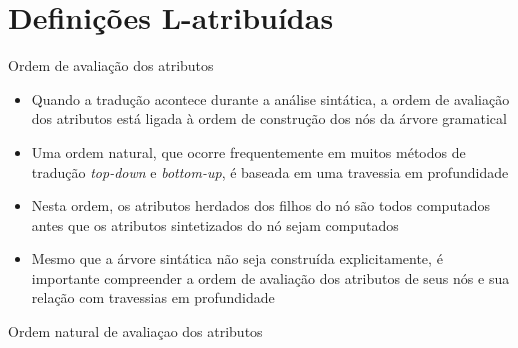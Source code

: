 \section{Definições L-atribuídas}

\begin{frame}[fragile]{Ordem de avaliação dos atributos}

    \begin{itemize}
        \item Quando a tradução acontece durante a análise sintática, a ordem de avaliação dos atributos está ligada à ordem de construção dos nós da
            árvore gramatical

        \item Uma ordem natural, que ocorre frequentemente em muitos métodos de tradução \textit{top-down} e \textit{bottom-up}, é baseada em uma
            travessia em profundidade

        \item Nesta ordem, os atributos herdados dos filhos do nó são todos computados antes que os atributos sintetizados do nó sejam computados

        \item Mesmo que a árvore sintática não seja construída explicitamente, é importante compreender a ordem de avaliação dos atributos de seus nós
            e sua relação com travessias em profundidade
    \end{itemize}

\end{frame}

\begin{frame}[fragile]{Ordem natural de avaliaçao dos atributos}

    \begin{algorithmic}[i]
        \vspace{0.2in}

            \EndFor
        \EndProcedure
    \end{algorithmic}

\end{frame}

